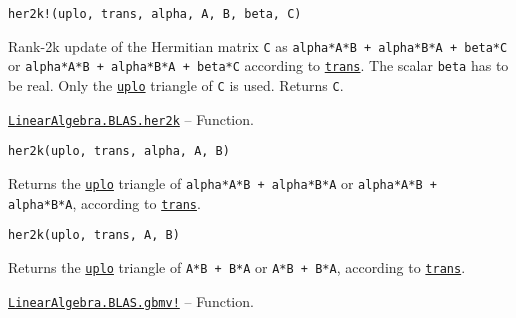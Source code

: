 \begin{adjustwidth}{2em}{0pt}


\begin{verbatim}
her2k!(uplo, trans, alpha, A, B, beta, C)
\end{verbatim}

Rank-2k update of the Hermitian matrix \texttt{C} as \texttt{alpha*A*B{\textquotesingle} + alpha*B*A{\textquotesingle} + beta*C} or \texttt{alpha*A{\textquotesingle}*B + alpha*B{\textquotesingle}*A + beta*C} according to \hyperlink{15951037910221396131}{\texttt{trans}}. The scalar \texttt{beta} has to be real. Only the \hyperlink{13880289478825450693}{\texttt{uplo}} triangle of \texttt{C} is used. Returns \texttt{C}.



\end{adjustwidth}
\hypertarget{1414422633857793327}{}
\hyperlink{1414422633857793327}{\texttt{LinearAlgebra.BLAS.her2k}}  -- {Function.}

\begin{adjustwidth}{2em}{0pt}


\begin{verbatim}
her2k(uplo, trans, alpha, A, B)
\end{verbatim}

Returns the \hyperlink{13880289478825450693}{\texttt{uplo}} triangle of \texttt{alpha*A*B{\textquotesingle} + alpha*B*A{\textquotesingle}} or \texttt{alpha*A{\textquotesingle}*B + alpha*B{\textquotesingle}*A}, according to \hyperlink{15951037910221396131}{\texttt{trans}}.




\begin{lstlisting}
her2k(uplo, trans, A, B)
\end{lstlisting}

Returns the \hyperlink{13880289478825450693}{\texttt{uplo}} triangle of \texttt{A*B{\textquotesingle} + B*A{\textquotesingle}} or \texttt{A{\textquotesingle}*B + B{\textquotesingle}*A}, according to \hyperlink{15951037910221396131}{\texttt{trans}}.



\end{adjustwidth}
\hypertarget{8676615954581837341}{}
\hyperlink{8676615954581837341}{\texttt{LinearAlgebra.BLAS.gbmv!}}  -- {Function.}


